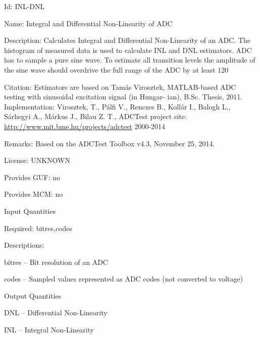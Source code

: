 \begin{tightdesc}
\item [Id:] INL-DNL
\item [Name:] Integral and Differential Non-Linearity of ADC
\item [Description:] Calculates Integral and Differential Non-Linearity of an ADC. The histogram of measured data is used to calculate INL and DNL estimators. ADC has to sample a pure sine wave. To estimate all transition levels the amplitude of the sine wave should overdrive the full range of the ADC by at least 120%
\item [Citation:] Estimators are based on Tamás Virosztek, MATLAB-based ADC testing with sinusoidal excitation signal (in Hungar- ian), B.Sc. Thesis, 2011. Implementation: Virosztek, T., Pálfi V., Renczes B., Kollár I., Balogh L., Sárhegyi A., Márkus J., Bilau Z. T., ADCTest project site: \url{http://www.mit.bme.hu/projects/adctest} 2000-2014
\item [Remarks:] Based on the ADCTest Toolbox v4.3, November 25, 2014.
\item [License:] UNKNOWN
\item [Provides GUF:] no
\item [Provides MCM:] no
\item [Input Quantities] \rule{0em}{0em}
    \begin{tightdesc}
    \item [Required:] 
        \textsf{bitres},\enspace \textsf{codes}
    \end{tightdesc}
\item [Descriptions:] \rule{0em}{0em}
    \begin{tightdesc}
        \item[\textsf{bitres}] -- Bit resolution of an ADC
        \item[\textsf{codes}] -- Sampled values represented as ADC codes (not converted to voltage)
    \end{tightdesc}
\item [Output Quantities] \rule{0em}{0em}
    \begin{tightdesc}
        \item[\textsf{DNL}] -- Differential Non-Linearity
        \item[\textsf{INL}] -- Integral Non-Linearity
    \end{tightdesc}
\end{tightdesc}
